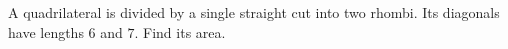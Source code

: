 A quadrilateral is divided by a single straight cut into two rhombi. Its diagonals have lengths $6$ and $7$. Find its area.
